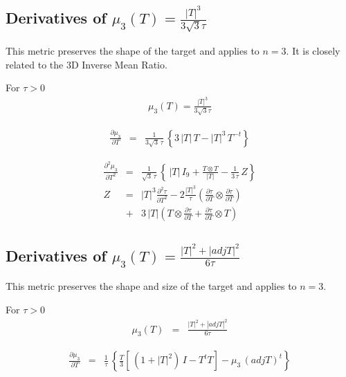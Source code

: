 \documentclass{report}
\begin{document}
\subsection{Derivatives of $\mu_3(T)=\frac{|T|^3}{3 \sqrt{3} \tau}$}

\noindent This metric preserves the shape of the target and applies
to $n=3$. It is closely related to the 3D Inverse Mean Ratio. \newline

\noindent For $\tau>0$
\begin{eqnarray}
\mu_3(T)=\frac{|T|^3}{3 \sqrt{3} \tau}
\end{eqnarray}

\begin{eqnarray}
\frac{\partial \mu_3}{\partial T} & = & \frac{1}{3 \sqrt{3} \, \tau} \, \left\{ 3 \, |T| \, T - |T|^3 \, T^{-t} \right\}
\end{eqnarray}


\begin{eqnarray}
\frac{\partial^2 \mu_3}{\partial T^2} & = & \frac{1}{\sqrt{3} \, \tau} \, \left\{ \, |T| \, I_9 + \frac{T \otimes T}{|T|} - \frac{1}{3 \, \tau} \, Z \right\} \\
Z & = & |T|^3 \frac{\partial^2 \tau}{\partial T^2} - 2 \frac{|T|^3}{\tau} \left( \frac{\partial \tau}{\partial T} \otimes \frac{\partial \tau}{\partial T} \right) \nonumber \\
 & + & 3 \, |T| \left( T \otimes \frac{\partial \tau}{\partial T} + \frac{\partial \tau}{\partial T} \otimes T \right)
\end{eqnarray}

\subsection{Derivatives of $\mu_3(T)=\frac{|T|^2 + |adj T|^2}{6 \tau}$}

\noindent This metric preserves the shape and size of the target and applies
to $n=3$. \newline

\noindent For $\tau>0$
\begin{eqnarray}
\mu_3 (T) & = & \frac{|T|^2 + |adj T|^2}{6 \tau}
\end{eqnarray}

\begin{eqnarray}
\frac{\partial \mu_3}{\partial T} & = & \frac{1}{\tau} \, \left\{ \frac{T}{3} \left[ \, (1+|T|^2) \, I - T^t T \right] - \mu_3 \, (adj T)^t \right\}
\end{eqnarray}
\end{document}
